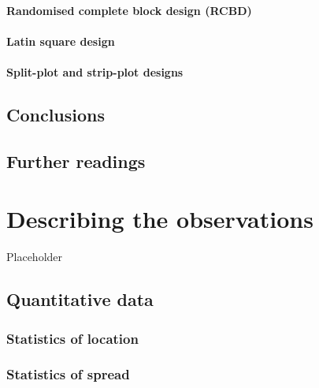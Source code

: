 \documentclass[a4paper,12pt,oneside]{book}
\begin{document}
\hypertarget{randomised-complete-block-design-rcbd}{%
\subsubsection{Randomised complete block design (RCBD)}\label{randomised-complete-block-design-rcbd}}

\hypertarget{latin-square-design}{%
\subsubsection{Latin square design}\label{latin-square-design}}

\hypertarget{split-plot-and-strip-plot-designs}{%
\subsubsection{Split-plot and strip-plot designs}\label{split-plot-and-strip-plot-designs}}

\hypertarget{conclusions-1}{%
\section{Conclusions}\label{conclusions-1}}

\hypertarget{further-readings-1}{%
\section{Further readings}\label{further-readings-1}}

\hypertarget{describing-the-observations}{%
\chapter{Describing the observations}\label{describing-the-observations}}

Placeholder

\hypertarget{quantitative-data}{%
\section{Quantitative data}\label{quantitative-data}}

\hypertarget{statistics-of-location}{%
\subsection{Statistics of location}\label{statistics-of-location}}

\hypertarget{statistics-of-spread}{%
\subsection{Statistics of spread}\label{statistics-of-spread}}
\end{document}
